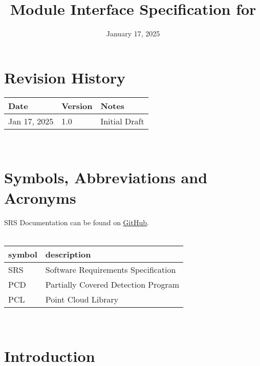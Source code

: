 \documentclass[12pt, titlepage]{article}
\begin{document}
\title{Module Interface Specification for \progname{}}

\author{\authname}

\date{January 17, 2025}

\maketitle


\section{Revision History}

\begin{tabularx}{\textwidth}{p{3cm}p{2cm}X}
\toprule {\bf Date} & {\bf Version} & {\bf Notes}\\
\midrule
Jan 17, 2025 & 1.0 & Initial Draft\\
\bottomrule
\end{tabularx}

~\newpage

\section{Symbols, Abbreviations and Acronyms}

SRS Documentation can be found on \href{https://github.com/takhtart/PCD/blob/main/docs/SRS/SRS.pdf}{GitHub}.\\
\\
\renewcommand{\arraystretch}{1.2}
\begin{tabular}{l l} 
  \toprule		
  \textbf{symbol} & \textbf{description}\\
  \midrule 
  SRS & Software Requirements Specification\\
  PCD & Partially Covered Detection Program \\
  PCL & Point Cloud Library \\
  \bottomrule
\end{tabular}\\

\newpage

\tableofcontents

\newpage


\section{Introduction}
\end{document}
